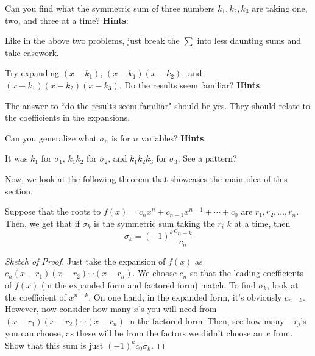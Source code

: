 \documentclass[11pt,titlepage]{scrartcl}
\newenvironment{hint}{\footnotesize \normalfont \textbf{Hints}:}{\hspace{-0.5ex}}
\begin{document}
\begin{exercisebox}
\begin{exercise}
Can you find what the symmetric sum of three numbers $k_1,k_2,k_3$ are taking one, two, and three at a time?
\begin{hint}
\begin{addhint}{
Like in the above two problems, just break the $\sum$ into less daunting sums and take casework.
}\end{addhint}
\end{hint}
\end{exercise}
\begin{exercise}
Try expanding $(x-k_1)$, $(x-k_1)(x-k_2),$ and $(x-k_1)(x-k_2)(x-k_3)$. Do the results seem familiar?
\begin{hint}
\begin{addhint}{
The answer to ``do the results seem familiar" should be yes. They should relate to the coefficients in the expansions.
}\end{addhint}
\end{hint}
\end{exercise}
\begin{exercise}
Can you generalize what $\sigma_n$ is for $n$ variables?
\begin{hint}
\begin{addhint}{
It was $k_1$ for $\sigma_1$, $k_1k_2$ for $\sigma_2$, and $k_1k_2k_3$ for $\sigma_3$. See a pattern?
}\end{addhint}
\end{hint}
\end{exercise}
\end{exercisebox}
Now, we look at the following theorem that showcases the main idea of this section.
\begin{theorem}\label{vietafor}
Suppose that the roots to $f(x)=c_nx^n+c_{n-1}x^{n-1}+\cdots+c_0$ are $r_1,r_2,\ldots,r_n$. Then, we get that if $\sigma_k$ is the symmetric sum taking the $r_i$ $k$ at a time, then
\[\sigma_k=(-1)^{k}\dfrac{c_{n-k}}{c_n}\]
\end{theorem}
\begin{proof}[Sketch of Proof]
Just take the expansion of $f(x)$ as $c_n(x-r_1)(x-r_2)\cdots(x-r_n)$. We choose $c_n$ so that the leading coefficients of $f(x)$ (in the expanded form and factored form) match. To find $\sigma_k$, look at the coefficient of $x^{n-k}$. On one hand, in the expanded form, it's obviously $c_{n-k}$. However, now consider how many $x$'s you will need from $(x-r_1)(x-r_2)\cdots(x-r_n)$ in the factored form. Then, see how many $-r_j$'s you can choose, as these will be from the factors we didn't choose an $x$ from. Show that this sum is just $(-1)^kc_0\sigma_k$.
\end{proof}
\end{document}
